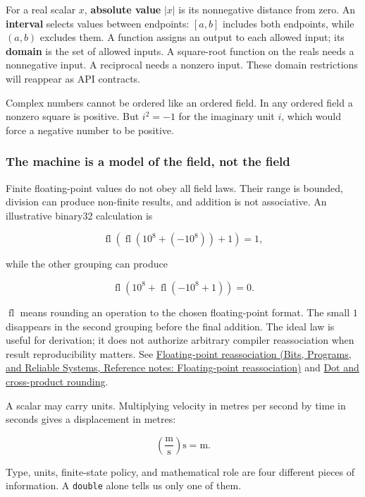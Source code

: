 For a real scalar \(x\), \textbf{absolute value} \(|x|\) is its nonnegative distance from zero. An \textbf{interval} selects values between endpoints: \([a,b]\) includes both endpoints, while \((a,b)\) excludes them. A function assigns an output to each allowed input; its \textbf{domain} is the set of allowed inputs. A square-root function on the reals needs a nonnegative input. A reciprocal needs a nonzero input. These domain restrictions will reappear as API contracts.

Complex numbers cannot be ordered like an ordered field. In any ordered field a nonzero square is positive. But \(i^2=-1\) for the imaginary unit \(i\), which would force a negative number to be positive.

\subsubsection{The machine is a model of the field, not the field}\label{01-foundations-i-ch017-the-machine-is-a-model-of-the-field-not-the-field}

Finite floating-point values do not obey all field laws. Their range is bounded, division can produce non-finite results, and addition is not associative. An illustrative binary32 calculation is

\[
\operatorname{fl}\!\left(\operatorname{fl}(10^8+(-10^8))+1\right)=1,
\]

while the other grouping can produce

\[
\operatorname{fl}\!\left(10^8+\operatorname{fl}(-10^8+1)\right)=0.
\]

\(\operatorname{fl}\) means rounding an operation to the chosen floating-point format. The small \(1\) disappears in the second grouping before the final addition. The ideal law is useful for derivation; it does not authorize arbitrary compiler reassociation when result reproducibility matters. See \href{../01-Bits-Programs-and-Reliable-Systems/main.pdf\#nameddest=appendix-c2ac4a84c283}{Floating-point reassociation (Bits, Programs, and Reliable Systems, Reference notes: Floating-point reassociation)} and \hyperref[appendix-5aef4f13483a]{Dot and cross-product rounding}.

A scalar may carry units. Multiplying velocity in metres per second by time in seconds gives a displacement in metres:

\[
\left(\frac{\mathrm m}{\mathrm s}\right)\mathrm s=\mathrm m.
\]

Type, units, finite-state policy, and mathematical role are four different pieces of information. A \texttt{double} alone tells us only one of them.

